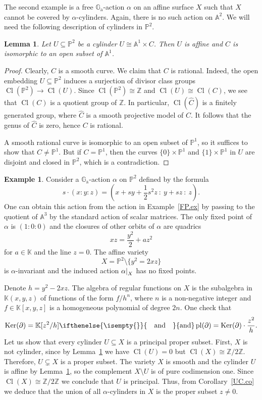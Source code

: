 \documentclass[a4paper, 12pt, reqno]{amsart}
\newcommand{\bb}{\mathbb}
\newcommand{\der}{\partial}
\newcommand{\Ga}{\bb{G}_\mathrm{a}}
\DeclareMathOperator{\Cl}{Cl}
\DeclareMathOperator{\Ker}{Ker}
\DeclareMathOperator{\pl}{pl}
\newcommand{\insertText}[2][]{%
    \ifthenelse{\isempty{#1}}{%
        \quad \text{#2} \quad%
    }{%
        #1 \text{#2} #1%
    }%
}
\newcommand{\restrict}[2]{
    \left.
    \kern-\nulldelimiterspace{#1}
    \right|_{#2}
}
\theoremstyle{definition}
\newtheorem{exam}[counter]{Example}
\theoremstyle{plain}
\newtheorem{lemm}[counter]{Lemma}
\begin{document}
The second example is a free $\Ga$-action $\alpha$ on an affine surface $X$ such that $X$ cannot be covered by $\alpha$-cylinders. Again, there is no such action on $\bb{A}^2$. We will need the following description of cylinders in $\bb{P}^2$.

\begin{lemm} \label{CP2.le}
Let $U \subseteq \bb{P}^2$ be a cylinder $U \cong \bb{A}^1 \times C$. Then $U$ is affine and $C$ is isomorphic to an open subset of $\bb{A}^1$.
\end{lemm}

\begin{proof}
Clearly, $C$ is a smooth curve. We claim that $C$ is rational. Indeed, the open embedding $U \subseteq \bb{P}^2$ induces a surjection of divisor class groups $\Cl(\bb{P}^2) \to \Cl(U)$. Since $\Cl(\bb{P}^2) \cong \bb{Z}$ and $\Cl(U) \cong \Cl(C)$, we see that $\Cl(C)$ is a quotient group of $\bb{Z}$. In particular, $\Cl(\hat{C})$ is a finitely generated group, where $\hat{C}$ is a smooth projective model of $C$. It follows that the genus of $\hat{C}$ is zero, hence $C$ is rational.

A smooth rational curve is isomorphic to an open subset of $\bb{P}^1$, so it suffices to show that $C \ne \bb{P}^1$. But if $C = \bb{P}^1$, then the curves $\{0\} \times \bb{P}^1$ and $\{1\} \times \bb{P}^1$ in $U$ are disjoint and closed in $\bb{P}^2$, which is a contradiction.
\end{proof}

\begin{exam}
Consider a $\Ga$-action $\alpha$ on $\bb{P}^2$ defined by the formula
$$
s \cdot (x : y : z) = \left(
    x + s y + \frac{1}{2} s^2 z \ : \ y + s z \ : \ z
\right).
$$
One can obtain this action from the action in Example~\ref{FP.ex} by passing to the quotient of $\bb{A}^3$ by the standard action of scalar matrices. The only fixed point of $\alpha$ is $(1 : 0 : 0)$ and the closures of other orbits of $\alpha$ are quadrics
$$
x z = \frac{y^2}{2} + a z^2
$$
for $a \in \bb{K}$ and the line $z = 0$. The affine variety
$$
X = \bb{P}^2 \setminus \{y^2 = 2 x z\}
$$
is $\alpha$-invariant and the induced action $\restrict{\alpha}{X}$ has no fixed points.

Denote $h = y^2 - 2 x z$. The algebra of regular functions on $X$ is the subalgebra in $\bb{K}(x, y, z)$ of functions of the form $f / h^n$, where $n$ is a non-negative integer and $f \in \bb{K}[x, y, z]$ is a homogeneous polynomial of degree $2 n$. One check that
$$
\Ker(\der) = \bb{K}[z^2 / h]
\insertText{and}
\pl(\der) = \Ker(\der) \cdot \frac{z^2}{h}.
$$
Let us show that every cylinder $U \subseteq X$ is a principal proper subset. First, $X$ is not cylinder, since by Lemma~\ref{CP2.le} we have $\Cl(U) = 0$ but $\Cl(X) \cong \bb{Z} / 2 \bb{Z}$. Therefore, $U \subsetneq X$ is a proper subset. The variety $X$ is smooth and the cylinder $U$ is affine by Lemma~\ref{CP2.le}, so the complement $X \setminus U$ is of pure codimension one. Since $\Cl(X) \cong \bb{Z} / 2 \bb{Z}$ we conclude that $U$ is principal. Thus, from Corollary~\ref{UC.co} we deduce that the union of all $\alpha$-cylinders in $X$ is the proper subset $z \ne 0$.
\end{exam}
\end{document}
